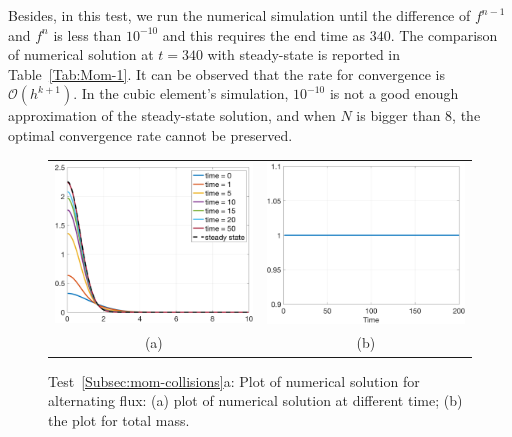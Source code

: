 \documentclass[preprint,11pt]{elsarticle}
\begin{document}
Besides, in this test, we run the numerical simulation until the difference of $f^{n-1}$ and $f^n$ is less than $10^{-10}$ and this requires the end time as $340$. The comparison of numerical solution at $t = 340$ with steady-state is reported in Table~\ref{Tab:Mom-1}. It can be observed that the rate for convergence is $\mathcal{O}(h^{k+1})$. In the cubic element's simulation, $10^{-10}$ is not a good enough approximation of the steady-state solution, and when $N$ is bigger than 8, the optimal convergence rate cannot be preserved.
%
\begin{figure}[H]
\centering
\begin{tabular}{cc}
\includegraphics[width=.45\textwidth,height = .3\textwidth]{./NumFig/Ini-Mom-1}
&\includegraphics[width=.45\textwidth,height = .3\textwidth]{./NumFig/Ini-Mom-1-Conv.png}\\
(a) & (b)
\end{tabular}
\caption{Test~\ref{Subsec:mom-collisions}a: Plot of numerical solution for alternating flux: (a) plot of numerical solution at different time; (b) the plot for total mass.}\label{Fig:Mom-1}
\end{figure}
\end{document}

